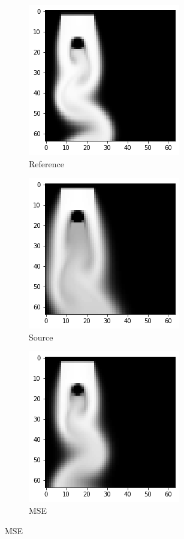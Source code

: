 \documentclass[a4paper,12pt,twoside]{report}
\begin{document}
\begin{figure}
	\centering
	\begin{subfigure}{0.32\textwidth}
		\centering
		\includegraphics[scale=0.5]{karman_low/ref}
		\caption{Reference}
	\end{subfigure}
	\begin{subfigure}{0.32\textwidth}
		\centering
		\includegraphics[scale=0.5]{karman_low/source}
		\caption{Source}
	\end{subfigure}
	\begin{subfigure}{0.32\textwidth}
		\centering
		\includegraphics[scale=0.5]{karman_low/mse}
		\caption{MSE}
	\end{subfigure}

\end{figure}
\end{document}
